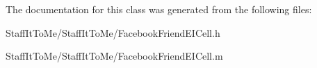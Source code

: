 \-The documentation for this class was generated from the following files\-:\begin{DoxyCompactItemize}
\item 
\-Staff\-It\-To\-Me/\-Staff\-It\-To\-Me/\-Facebook\-Friend\-E\-I\-Cell.\-h\item 
\-Staff\-It\-To\-Me/\-Staff\-It\-To\-Me/\-Facebook\-Friend\-E\-I\-Cell.\-m\end{DoxyCompactItemize}
